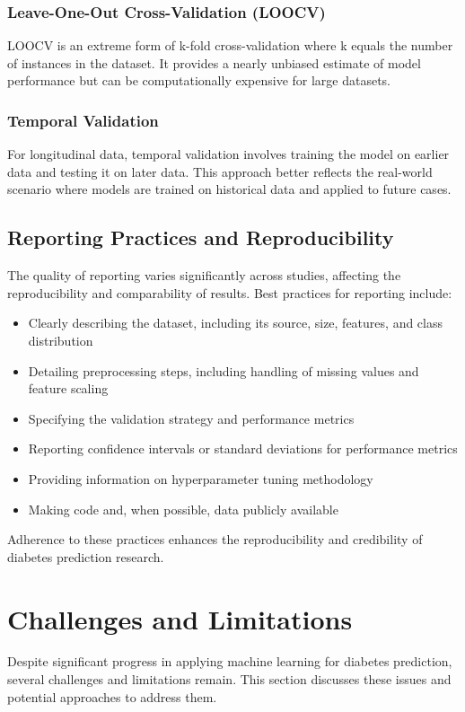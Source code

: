 \documentclass[journal]{IEEEtran}
\begin{document}
\subsubsection{Leave-One-Out Cross-Validation (LOOCV)}
LOOCV is an extreme form of k-fold cross-validation where k equals the number of instances in the dataset. It provides a nearly unbiased estimate of model performance but can be computationally expensive for large datasets.

\subsubsection{Temporal Validation}
For longitudinal data, temporal validation involves training the model on earlier data and testing it on later data. This approach better reflects the real-world scenario where models are trained on historical data and applied to future cases.

\subsection{Reporting Practices and Reproducibility}
The quality of reporting varies significantly across studies, affecting the reproducibility and comparability of results. Best practices for reporting include:

\begin{itemize}
    \item Clearly describing the dataset, including its source, size, features, and class distribution
    \item Detailing preprocessing steps, including handling of missing values and feature scaling
    \item Specifying the validation strategy and performance metrics
    \item Reporting confidence intervals or standard deviations for performance metrics
    \item Providing information on hyperparameter tuning methodology
    \item Making code and, when possible, data publicly available
\end{itemize}

Adherence to these practices enhances the reproducibility and credibility of diabetes prediction research.

\section{Challenges and Limitations}
Despite significant progress in applying machine learning for diabetes prediction, several challenges and limitations remain. This section discusses these issues and potential approaches to address them.
\end{document}
